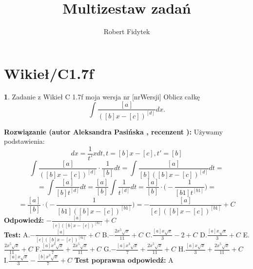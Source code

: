 \documentclass[12pt, a4paper]{article}
\title{Multizestaw zadań}
\author{Robert Fidytek}
\date{}
\theoremstyle{definition} %
\newtheorem{zad}{}
\newcommand{\kategoria}[1]{\section{#1}} %
\newcommand{\zadStart}[1]{\begin{zad}#1\newline} %
\newcommand{\zadStop}{\end{zad}}   %
\newcommand{\rozwStart}[2]{\noindent \textbf{Rozwiązanie (autor #1 , recenzent #2): }\newline} %
\newcommand{\rozwStop}{\newline}                                            %
\newcommand{\odpStart}{\noindent \textbf{Odpowiedź:}\newline}    %
\newcommand{\odpStop}{\newline}                                             %
\newcommand{\testStart}{\noindent \textbf{Test:}\newline} %
\newcommand{\testStop}{\newline} %
\newcommand{\kluczStart}{\noindent \textbf{Test poprawna odpowiedź:}\newline} %
\newcommand{\kluczStop}{\newline} %
\begin{document}
\maketitle


\kategoria{Wikieł/C1.7f}
\zadStart{Zadanie z Wikieł C 1.7f moja wersja nr [nrWersji]}
Oblicz całkę $$\int \frac{[a]}{([b]x-[c])^{[d]}}dx.$$
\zadStop
\rozwStart{Aleksandra Pasińska}{}
Używamy podstawienia:
$$dx=\frac{1}{t'}xdt,t=[b]x-[c], t'=[b]$$
$$\int \frac{[a]}{([b]x-[c])^{[d]}}\cdot \frac{1}{[b]}dt=\int \frac{[a]}{[b]([b]x-[c])^{[d]}}dt=$$
$$=\int \frac{[a]}{[b]t^{[d]}}dt=\frac{[a]}{[b]}\int \frac{1}{t^{[d]}}dt=\frac{[a]}{[b]}\cdot \bigg(-\frac{1}{[b1]t^{[b1]}}\bigg)=$$
$$=\frac{[a]}{[b]}\cdot \bigg(-\frac{1}{[b1]([b]x-[c])^{[b1]}}\bigg)=-\frac{[a]}{[e]([b]x-[c])^{[b1]}}+C$$
\rozwStop
\odpStart
$-\frac{[a]}{[e]([b]x-[c])^{[b1]}}+C$\\
\odpStop
\testStart
A.$-\frac{[a]}{[e]([b]x-[c])^{[b1]}}+C$
B.$-\frac{2x^5\sqrt{x}}{11}+C$
C.$\frac{[a]x\sqrt{x}}{3}-2+C$
D.$\frac{[a]x\sqrt{x}}{3}+C$
E.$\frac{2x^5\sqrt{x}}{11}+C$
F.$\frac{[a]x^3\sqrt{x}}{7}+\frac{2x^5\sqrt{x}}{11}+C$
G.$-\frac{[a]x^3\sqrt{x}}{7}+\frac{2x^5\sqrt{x}}{11}+C$
H.$\frac{[a]x\sqrt{x}}{3}+\frac{2x^5\sqrt{x}}{11}+C$
I.$\frac{[a]x\sqrt{x}}{3}-\frac{[b]x^3\sqrt{x}}{7}+C$
\testStop
\kluczStart
A
\kluczStop
\end{document}
